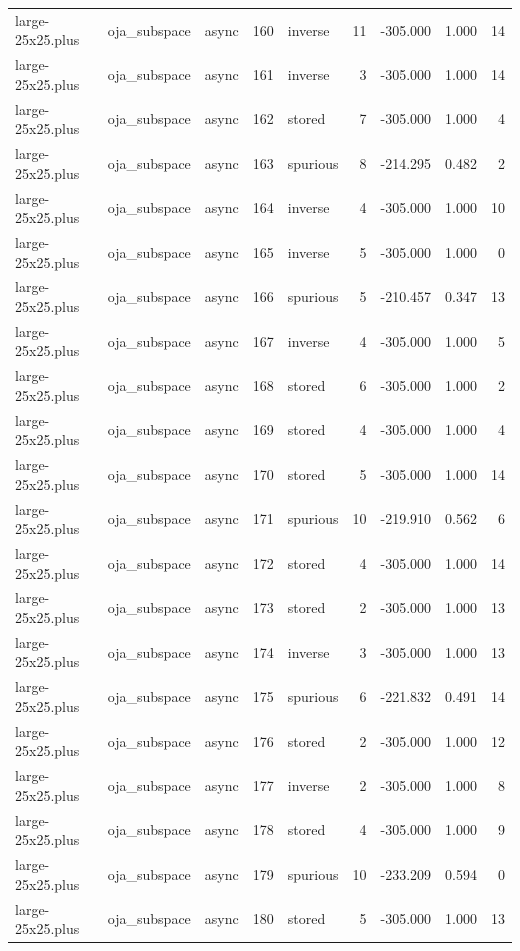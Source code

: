 \begin{tabular}{lllrlrrrr}
large-25x25.plus & oja\_subspace & async & 160 & inverse & 11 & -305.000 & 1.000 & 14 \\
large-25x25.plus & oja\_subspace & async & 161 & inverse & 3 & -305.000 & 1.000 & 14 \\
large-25x25.plus & oja\_subspace & async & 162 & stored & 7 & -305.000 & 1.000 & 4 \\
large-25x25.plus & oja\_subspace & async & 163 & spurious & 8 & -214.295 & 0.482 & 2 \\
large-25x25.plus & oja\_subspace & async & 164 & inverse & 4 & -305.000 & 1.000 & 10 \\
large-25x25.plus & oja\_subspace & async & 165 & inverse & 5 & -305.000 & 1.000 & 0 \\
large-25x25.plus & oja\_subspace & async & 166 & spurious & 5 & -210.457 & 0.347 & 13 \\
large-25x25.plus & oja\_subspace & async & 167 & inverse & 4 & -305.000 & 1.000 & 5 \\
large-25x25.plus & oja\_subspace & async & 168 & stored & 6 & -305.000 & 1.000 & 2 \\
large-25x25.plus & oja\_subspace & async & 169 & stored & 4 & -305.000 & 1.000 & 4 \\
large-25x25.plus & oja\_subspace & async & 170 & stored & 5 & -305.000 & 1.000 & 14 \\
large-25x25.plus & oja\_subspace & async & 171 & spurious & 10 & -219.910 & 0.562 & 6 \\
large-25x25.plus & oja\_subspace & async & 172 & stored & 4 & -305.000 & 1.000 & 14 \\
large-25x25.plus & oja\_subspace & async & 173 & stored & 2 & -305.000 & 1.000 & 13 \\
large-25x25.plus & oja\_subspace & async & 174 & inverse & 3 & -305.000 & 1.000 & 13 \\
large-25x25.plus & oja\_subspace & async & 175 & spurious & 6 & -221.832 & 0.491 & 14 \\
large-25x25.plus & oja\_subspace & async & 176 & stored & 2 & -305.000 & 1.000 & 12 \\
large-25x25.plus & oja\_subspace & async & 177 & inverse & 2 & -305.000 & 1.000 & 8 \\
large-25x25.plus & oja\_subspace & async & 178 & stored & 4 & -305.000 & 1.000 & 9 \\
large-25x25.plus & oja\_subspace & async & 179 & spurious & 10 & -233.209 & 0.594 & 0 \\
large-25x25.plus & oja\_subspace & async & 180 & stored & 5 & -305.000 & 1.000 & 13 \\

\end{tabular}
